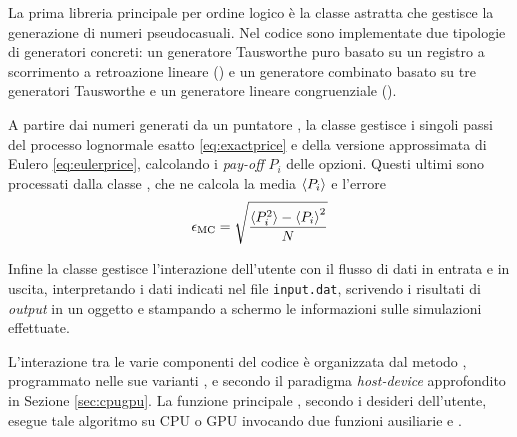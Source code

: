 La prima libreria principale per ordine logico è la classe astratta  che gestisce la generazione di numeri pseudocasuali. Nel codice sono implementate due tipologie di generatori concreti: un generatore Tausworthe puro basato su un registro a scorrimento a retroazione lineare () e un generatore combinato basato su tre generatori Tausworthe e un generatore lineare congruenziale ().

A partire dai numeri generati da un puntatore , la classe  gestisce i singoli passi del processo lognormale esatto \eqref{eq:exactprice} e della versione approssimata di Eulero \eqref{eq:eulerprice}, calcolando i \textit{pay-off} $P_i$ delle opzioni. Questi ultimi sono processati dalla classe , che ne calcola la media $\braket{P_i}$ e l'errore
\begin{equation}
    \epsilon_\text{MC} = \sqrt{\frac{\braket{P_i^2} - \braket{P_i}^2}{N}}
    \label{eq:mcerror}
\end{equation}

Infine la classe  gestisce l'interazione dell'utente con il flusso di dati in entrata e in uscita, interpretando i dati indicati nel file \verb|input.dat|, scrivendo i risultati di \textit{output} in un oggetto  e stampando a schermo le informazioni sulle simulazioni effettuate.

L'interazione tra le varie componenti del codice è organizzata dal metodo  , programmato nelle sue varianti ,  e  secondo il paradigma \textit{host-device} approfondito in Sezione \ref{sec:cpugpu}. La funzione principale , secondo i desideri dell'utente, esegue tale algoritmo su CPU o GPU invocando due funzioni ausiliarie  e .

